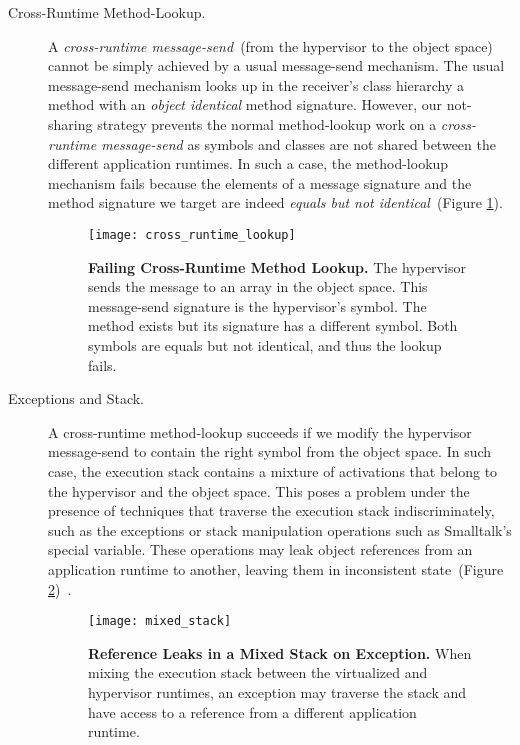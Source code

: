 \begin{description}

\item[Cross-Runtime Method-Lookup.]A \emph{cross-runtime message-send}~(from the hypervisor to the object space) cannot be simply achieved by a usual message-send mechanism. The usual message-send mechanism looks up in the receiver's class hierarchy a method with an \emph{object identical} method signature. However, our not-sharing strategy prevents the normal method-lookup work on a \emph{cross-runtime message-send} as symbols and classes are not shared between the different application runtimes. In such a case, the method-lookup mechanism fails because the elements of a message signature and the method signature we target are indeed \emph{equals but not identical}~(Figure \ref{fig:cross_runtime_lookup}).

\begin{figure}[ht]
\center
\texttt{[image: cross\_runtime\_lookup]}
\caption{\textbf{Failing Cross-Runtime Method Lookup.} The hypervisor sends the  message to an array in the object space. This message-send signature is the hypervisor's  symbol. The  method exists but its signature has a different  symbol. Both symbols are equals but not identical, and thus the lookup fails.\label{fig:cross_runtime_lookup}}
\end{figure}

\item[Exceptions and Stack.] A cross-runtime method-lookup succeeds if we modify the hypervisor message-send to contain the right symbol from the object space. In such case, the execution stack contains a mixture of activations that belong to the hypervisor and the object space. This poses a problem under the presence of techniques that traverse the execution stack indiscriminately, such as the exceptions or stack manipulation operations such as Smalltalk's  special variable. These operations may leak object references from an application runtime to another, leaving them in inconsistent state~(Figure \ref{fig:mixed_stack})~\cite{Mett10a}.

\begin{figure}[ht]
\center
\texttt{[image: mixed\_stack]}
\caption{\textbf{Reference Leaks in a Mixed Stack on Exception.} When mixing the execution stack between the virtualized and hypervisor runtimes, an exception may traverse the stack and have access to a reference from a different application runtime.\label{fig:mixed_stack}}
\end{figure}

\end{description}

